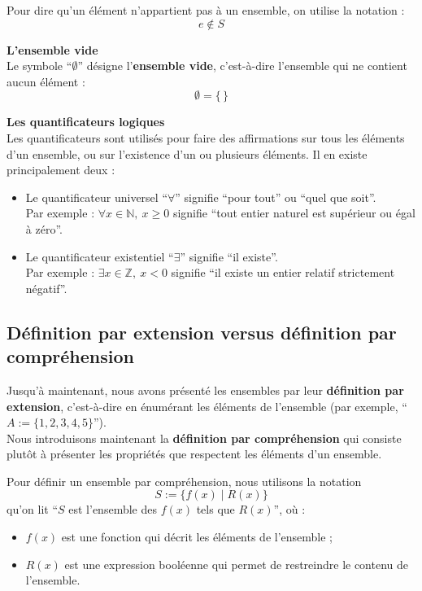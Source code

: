 \documentclass[12]{article}%
\theoremstyle{plain}
\theoremstyle{definition}
\theoremstyle{remark}
\begin{document}
Pour dire qu’un élément n’appartient pas à un ensemble, on utilise la notation :
\[
e \notin S
\]

\bigskip

\textbf{L’ensemble vide} \\
Le symbole “$\emptyset$” désigne l’\textbf{ensemble vide}, c’est-à-dire l’ensemble qui ne contient aucun élément :
\[
\emptyset = \{\,\}
\]

\bigskip

\textbf{Les quantificateurs logiques} \\
Les quantificateurs sont utilisés pour faire des affirmations sur tous les éléments d’un ensemble, ou sur l’existence d’un ou plusieurs éléments. Il en existe principalement deux :

\begin{itemize}
	\item Le quantificateur universel “$\forall$” signifie “pour tout” ou “quel que soit”. \\
	Par exemple : \quad $\forall x \in \mathbb{N},\ x \geq 0$ \quad signifie “tout entier naturel est supérieur ou égal à zéro”.
	
	\item Le quantificateur existentiel “$\exists$” signifie “il existe”. \\
	Par exemple : \quad $\exists x \in \mathbb{Z},\ x < 0$ \quad signifie “il existe un entier relatif strictement négatif”.
\end{itemize}

\subsection{Définition par extension versus définition par compréhension}

Jusqu'à maintenant, nous avons présenté les ensembles par leur \textbf{définition par extension}, c'est-à-dire en énumérant les éléments de l'ensemble (par exemple, ``$A := \{1, 2, 3, 4, 5\}$''). \\
Nous introduisons maintenant la \textbf{définition par compréhension} qui consiste plutôt à présenter les propriétés que respectent les éléments d’un ensemble.

\bigskip

Pour définir un ensemble par compréhension, nous utilisons la notation 
\[
S := \{ f(x) \mid R(x) \}
\]
qu’on lit ``$S$ est l’ensemble des $f(x)$ tels que $R(x)$'', où :
\begin{itemize}
	\item $f(x)$ est une fonction qui décrit les éléments de l’ensemble ;
	\item $R(x)$ est une expression booléenne qui permet de restreindre le contenu de l’ensemble.
\end{itemize}
\end{document}
